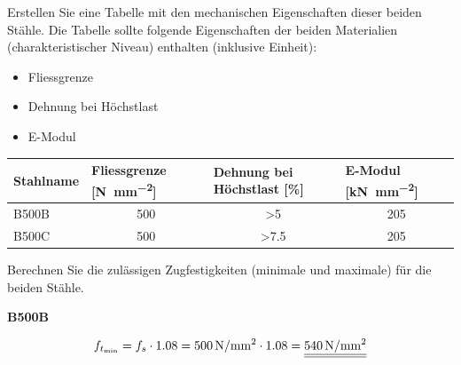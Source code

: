 \begin{questions}
    \question
    Erstellen Sie eine Tabelle mit den mechanischen Eigenschaften dieser beiden Stähle. Die Tabelle sollte folgende Eigenschaften der beiden Materialien (charakteristischer Niveau) enthalten (inklusive Einheit):

    \begin{itemize}
        \item Fliessgrenze
        \item Dehnung bei Höchstlast
        \item E-Modul
    \end{itemize}


    \begin{solution}
        \begin{table}[H]
            \centering
            \small
            \label{tab:stahleigenschaften}
            \begin{tabular}{lccc}
                \toprule
                Stahlname & \multicolumn{1}{l}{Fliessgrenze {[}\si{\newton\per\mm\squared}{]}} & \multicolumn{1}{l}{Dehnung bei Höchstlast {[}\%{]}} & \multicolumn{1}{l}{E-Modul {[}\si{\kilo\newton\per\mm\squared}{]}} \\ \midrule
                B500B     & 500                                                                & \textgreater{}5                                     & 205                                                                \\
                B500C     & 500                                                                & \textgreater{}7.5                                   & 205                                                                \\ \bottomrule
            \end{tabular}
        \end{table}

    \end{solution}

    \question

    Berechnen Sie die zulässigen Zugfestigkeiten (minimale und maximale) für die beiden Stähle.


    \begin{solution}

        \textbf{B500B}

        \begin{equation*}
            f_{t_\text{min}} = f_s \cdot 1.08 = \myNmm{500} \cdot 1.08 = \FinRes{\myNmm{540}}
        \end{equation*}


\end{solution}
\end{questions}
